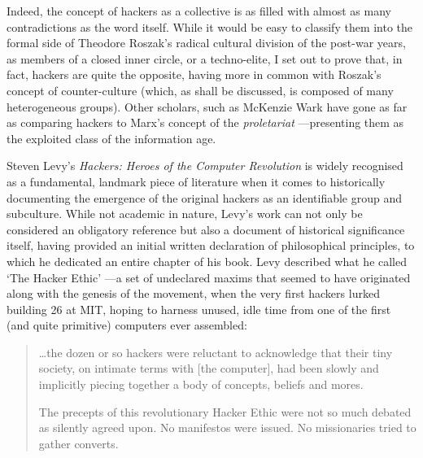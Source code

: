 Indeed, the concept of hackers as a collective is as filled with almost as many contradictions as the word itself. While it would be easy to classify them into the formal side of Theodore Roszak's \citeyearpar{roszak69} radical cultural division of the post-war years, as members of a closed inner circle, or a techno-elite, I set out to prove that, in fact, hackers are quite the opposite, having more in common with Roszak's concept of counter-culture (which, as shall be discussed, is composed of many heterogeneous groups). Other scholars, such as McKenzie Wark \citeyearpar{wark04} have gone as far as comparing hackers to Marx's concept of the \textit{proletariat} ---presenting them as the exploited class of the information age.

Steven Levy's \textit{Hackers: Heroes of the Computer Revolution} \citeyearpar{levy84} is widely recognised as a fundamental, landmark piece of literature when it comes to historically documenting the emergence of the original hackers as an identifiable group and subculture. While not academic in nature, Levy's work can not only be considered an obligatory reference but also a document of historical significance itself, having provided an initial written declaration of philosophical principles, to which he dedicated an entire chapter of his book. Levy described what he called `The Hacker Ethic' ---a set of undeclared maxims that seemed to have originated along with the genesis of the movement, when the very first hackers lurked building 26 at MIT, hoping to harness unused, idle time from one of the first (and quite primitive) computers ever assembled:



\begin{quotation}
\ldots the dozen or so hackers were reluctant to acknowledge that their tiny society, on intimate terms with [the computer], had been slowly and implicitly piecing together a body of concepts, beliefs and mores.

The precepts of this revolutionary Hacker Ethic were not so much debated as silently agreed upon. No manifestos were issued. No missionaries tried to gather converts.
\end{quotation}

